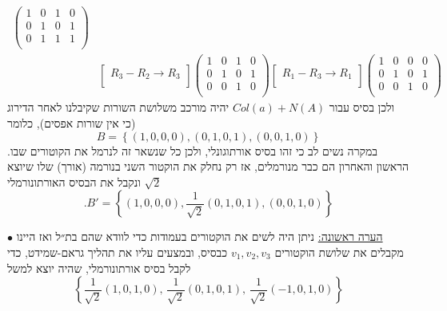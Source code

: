 \documentclass[12pt, a4paper]{article}
\begin{document}
\begin{enumerate}
\begin{enumerate}
\begin{align*}
\begin{pmatrix}
    1&0&1&0\\
    0&1&0&1\\
    0&1&1&1\\
    \end{pmatrix}
\\&\begin{bmatrix}
    R_3-R_2\rightarrow R_3\\
\end{bmatrix}
\begin{pmatrix}
    1&0&1&0\\
    0&1&0&1\\
    0&0&1&0\\
    \end{pmatrix}
    \begin{bmatrix}
    R_1-R_3\rightarrow R_1\\
\end{bmatrix}
\begin{pmatrix}
    1&0&0&0\\
    0&1&0&1\\
    0&0&1&0\\
    \end{pmatrix}
\end{align*}
ולכן בסיס עבור
$Col(a)+N(A)$
יהיה מורכב משלושת השורות שקיבלנו לאחר הדירוג (כי אין שורות אפסים), כלומר
$$B=\left\{
(1,0,0,0),
(0,1,0,1),
(0,0,1,0)
\right\}$$
במקרה נשים לב כי זהו בסיס אורתוגונלי, ולכן כל שנשאר זה לנרמל את הקוטורים שבו. הראשון והאחרון הם כבר מנורמלים, אז רק נחלק את הוקטור השני בנורמה (אורך) שלו שיוצא
$\sqrt{2}$
ונקבל את הבסיס האורתונורמלי
$$.B'=\left\{
(1,0,0,0),
\frac{1}{\sqrt{2}}(0,1,0,1),
(0,0,1,0)
\right\}$$

$\bullet$
\underline{הערה ראשונה:}
ניתן היה לשים את הוקטורים בעמודות כדי לוודא שהם בת״ל ואז היינו מקבלים את שלושת הוקטורים
$v_1,v_2,v_3$
כבסיס, ובמצעים עליו את תהליך גראם-שמידט, כדי לקבל בסיס אורתונורמלי, שהיה יוצא למשל
$$\left\{
\frac{1}{\sqrt{2}}(1,0,1,0),\, \frac{1}{\sqrt{2}}(0,1,0,1),\,
\frac{1}{\sqrt{2}}(-1,0,1,0)
\right\}$$


\end{enumerate}
\end{enumerate}
\end{document}
